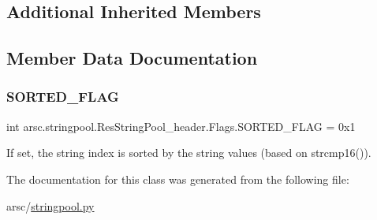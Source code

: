 \subsection*{Additional Inherited Members}


\subsection{Member Data Documentation}
\mbox{\label{classarsc_1_1stringpool_1_1ResStringPool__header_1_1Flags_af354a9864bce5baf864b5c5ea951bead}} 
\subsubsection{\texorpdfstring{S\+O\+R\+T\+E\+D\+\_\+\+F\+L\+AG}{SORTED\_FLAG}}
{\footnotesize\ttfamily int arsc.\+stringpool.\+Res\+String\+Pool\+\_\+header.\+Flags.\+S\+O\+R\+T\+E\+D\+\_\+\+F\+L\+AG = 0x1\hspace{0.3cm}{\ttfamily [static]}}



If set, the string index is sorted by the string values (based on strcmp16()). 



The documentation for this class was generated from the following file\+:\begin{DoxyCompactItemize}
\item 
arsc/\mbox{\hyperlink{stringpool_8py}{stringpool.\+py}}\end{DoxyCompactItemize}
